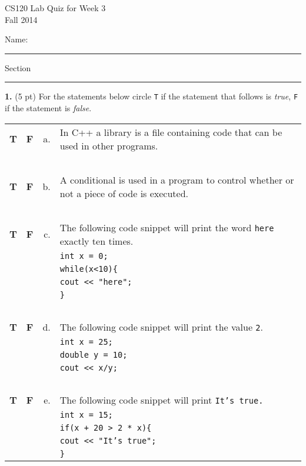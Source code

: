 \documentclass[12pt,openbib]{article}
\begin{document}
\thispagestyle{empty}
\vspace{-1.0in}
\Large
\begin{center}
\textsf{CS120  Lab Quiz for Week 3}\\
\large
\textsf{Fall 2014}
\end{center}
\vspace{-0.2in}
\large\textsf{Name: }\rule[-0.01in]{2.5in}{0.015in}
\hspace{0.5in} Section \rule[-0.01in]{1.0in}{0.015in}

\normalsize
\rm

{\bf 1.} (5 pt) For the statements below circle {\tt T} if the statement
that follows is {\em true}, {\tt F} if the statement is {\em false}.


\small
\begin{tabular}{ccrl}
{\bf T} & {\bf F} & a. & In C++ a library is a file containing code that can be used in other programs.\\ \ \\ 
           
 {\bf T} & {\bf F} & b. & A conditional is used in a program to control whether or not a piece of code is executed.\\  \ \\

 {\bf T} & {\bf F} & c. & The following code snippet will print the word {\tt here} exactly ten times.\\ 
& & & \tt{int x = 0;} \\
& & & \tt{while(x<10)\{}\\
& & & \tt{\hspace*{0.5in}cout << "here";}\\
& & & \tt{\}}\\ \ \\

 {\bf T} & {\bf F} & d. &  The following code snippet will print the value {\tt 2}.\\ 
& & & \tt{int x = 25;} \\
& & & \tt{double y = 10;} \\
& & & \tt{cout << x/y;}\\ \ \\
     
 {\bf T} & {\bf F} & e. & The following code snippet will print {\tt It's true.} \\
& & & \tt{int x = 15;} \\
& & & \tt{if(x + 20 > 2 * x)\{}\\
& & & \tt{\hspace*{0.5in}cout << "It's true";}\\
& & & \tt{\}}\\
\end{tabular}
\end{document}
